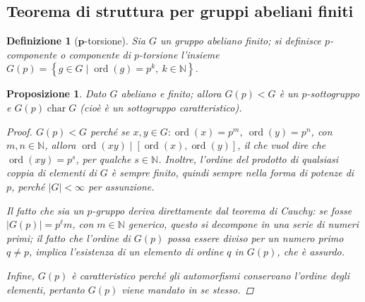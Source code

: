 \documentclass[12pt]{scrartcl}
\theoremstyle{style}
\newtheorem{definizione}{Definizione}[section]
\newtheorem{prop}{Proposizione}[section]
\numberwithin{equation}{subsection}
\begin{document}
\subsection{Teorema di struttura per gruppi abeliani finiti}
\begin{definizione}
	[$\mathbf{p}$-torsione]
Sia $G$ un gruppo abeliano finito; si definisce \textit{$p$-componente} o \textit{componente di $p$-torsione} l'insieme $G(p) = \left\{ g \in  G  \mid \operatorname{ord}(g) =p^k, \ k \in \mathbb{N} \right\} $.
\end{definizione}
\begin{prop}
	Dato $G$ abeliano e finito; allora $G(p) < G$ \`e un $p$-sottogruppo e $G(p) \operatorname{char} G$ (cio\`e \`e un sottogruppo caratteristico).
	\begin{proof}
		$G(p) < G$ perch\'e se $x,y \in G : \operatorname{ord}(x) =p^m,\  \operatorname{ord}(y) =p^n$, con $m,n \in \mathbb{N}$, allora $\operatorname{ord}(xy)  \mid [\operatorname{ord}(x) , \operatorname{ord}(y) ]$, il che vuol dire che $\operatorname{ord}(xy) = p^s$, per qualche $s \in  \mathbb{N}$.
		Inoltre, l'ordine del prodotto di qualsiasi coppia di elementi di $G$ \`e sempre finito, quindi sempre nella forma di potenze di $p$, perch\'e $\lvert G \rvert < \infty$ per assunzione.

		Il fatto che sia un $p$-gruppo deriva direttamente dal teorema di Cauchy: se fosse $\lvert G(p) \rvert = p^\ell m $, con $m \in \mathbb{N}$ generico, questo si decompone in una serie di numeri primi; il fatto che l'ordine di $G(p)$ possa essere diviso per un numero primo $q\neq p$, implica l'esistenza di un elemento di ordine $q$ in $G(p)$, che \`e assurdo.

		Infine, $G(p)$ \`e caratteristico perch\'e gli automorfismi conservano l'ordine degli elementi, pertanto $G(p)$ viene mandato in se stesso.
	\end{proof}
\end{prop}
\end{document}
